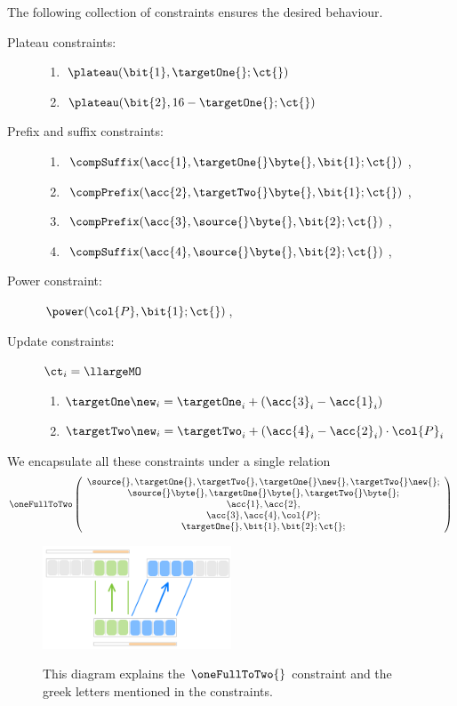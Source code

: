 The following collection of constraints ensures the desired behaviour.
\begin{description}
	\item[Plateau constraints:]
	\begin{enumerate}
		\item $\plateau(\bit{1}, \targetOne{}\mark{}; \ct{})$
		\item $\plateau(\bit{2}, 16 - \targetOne{}\mark{}; \ct{})$
	\end{enumerate}
	\item[Prefix and suffix constraints:]
	\begin{enumerate}
		\item $\compSuffix(\acc{1}, \targetOne{}\byte{}, \bit{1}; \ct{})$, %
		\item $\compPrefix(\acc{2}, \targetTwo{}\byte{}, \bit{1}; \ct{})$, %
		\item $\compPrefix(\acc{3}, \source{}\byte{}, \bit{2}; \ct{})$, %
		\item $\compSuffix(\acc{4}, \source{}\byte{}, \bit{2}; \ct{})$, %
	\end{enumerate}
	\item[Power constraint:] $\power(\col{P}, \bit{1}; \ct{})$,
	\item[Update constraints:] \If $\ct_{i} = \llargeMO$ \Then
	\begin{enumerate}
		\item $\targetOne\new_i = \targetOne_i + (\acc{3}_i - \acc{1}_i)$
		\item $\targetTwo\new_i = \targetTwo_i + (\acc{4}_i - \acc{2}_i) \cdot \col{P}_i$
	\end{enumerate}
\end{description}
We encapsulate all these constraints under a single relation
\[
	\oneFullToTwo
	\left(
	\begin{array}{c}
	\source{}, \targetOne{}, \targetTwo{}, \targetOne{}\new{}, \targetTwo{}\new{};\\
	\source{}\byte{}, \targetOne{}\byte{}, \targetTwo{}\byte{};\\
	\acc{1}, \acc{2},\\
	\acc{3}, \acc{4}, \col{P}; \\
	\targetOne{}\mark{}, \bit{1}, \bit{2}; \ct{};
	\end{array}
	\right)
\]

\begin{figure}[h!]
\centering
\includegraphics[width = 0.5\textwidth]{drawing/1_full_to_2}
\label{fig: one full to two}
\caption{This diagram explains the $\oneFullToTwo{}$ constraint and the greek letters mentioned in the constraints.}
\end{figure}
